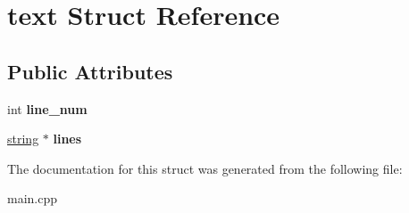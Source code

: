 \hypertarget{structtext}{}\section{text Struct Reference}
\label{structtext}
\subsection*{Public Attributes}
\begin{DoxyCompactItemize}
\item 
\mbox{\label{structtext_abcf08222247ab3b35d0f9616e6edadf1}} 
int {\bfseries line\+\_\+num}
\item 
\mbox{\label{structtext_a76cd255a8d3233813168fa06bf03ac31}} 
\hyperlink{structstring}{string} $\ast$ {\bfseries lines}
\end{DoxyCompactItemize}


The documentation for this struct was generated from the following file\+:\begin{DoxyCompactItemize}
\item 
main.\+cpp\end{DoxyCompactItemize}
